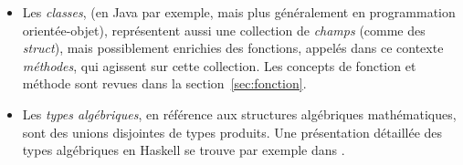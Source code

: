 \documentclass[a4paper,francais]{insalyon}
\begin{document}
\begin{itemize}
\item Les \emph{classes}, (en Java par exemple, mais plus généralement en programmation orientée-objet), représentent aussi une collection de \emph{champs} (comme des \emph{struct}), mais possiblement enrichies des fonctions, appelés dans ce contexte \emph{méthodes}, qui agissent sur cette collection. Les concepts de fonction et méthode sont revues dans la section~\ref{sec:fonction}.
\item Les \emph{types algébriques}, en référence aux structures algébriques mathématiques, sont des unions disjointes de types produits. Une présentation détaillée des types algébriques en Haskell se trouve par exemple dans \cite[chapitre 3]{haskell}.    
\end{itemize}

\captionsetup[subfigure]{labelformat=empty}
\begin{figure}[htbp]
  \centering
  \parbox[b]{7cm}{
     \\
}
\end{figure}
\end{document}
